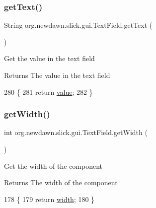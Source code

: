 \subsubsection{\texorpdfstring{get\+Text()}{getText()}}
{\footnotesize\ttfamily String org.\+newdawn.\+slick.\+gui.\+Text\+Field.\+get\+Text (\begin{DoxyParamCaption}{ }\end{DoxyParamCaption})\hspace{0.3cm}{\ttfamily [inline]}}

Get the value in the text field

\begin{DoxyReturn}{Returns}
The value in the text field 
\end{DoxyReturn}

\begin{DoxyCode}
280                             \{
281         \textcolor{keywordflow}{return} \mbox{\hyperlink{classorg_1_1newdawn_1_1slick_1_1gui_1_1_text_field_a23c571aa0aa30ccbc28a090a06a444b7}{value}};
282     \}
\end{DoxyCode}
\mbox{\label{classorg_1_1newdawn_1_1slick_1_1gui_1_1_text_field_a2080debdd772603b3165cda49864255d}} 
\subsubsection{\texorpdfstring{get\+Width()}{getWidth()}}
{\footnotesize\ttfamily int org.\+newdawn.\+slick.\+gui.\+Text\+Field.\+get\+Width (\begin{DoxyParamCaption}{ }\end{DoxyParamCaption})\hspace{0.3cm}{\ttfamily [inline]}}

Get the width of the component

\begin{DoxyReturn}{Returns}
The width of the component 
\end{DoxyReturn}

\begin{DoxyCode}
178                           \{
179         \textcolor{keywordflow}{return} \mbox{\hyperlink{classorg_1_1newdawn_1_1slick_1_1gui_1_1_text_field_aa0b76a23e9820ca0c01294f8de515b8e}{width}};
180     \}
\end{DoxyCode}
\mbox{\label{classorg_1_1newdawn_1_1slick_1_1gui_1_1_text_field_a42552f68cb0c015f2d127fd190a0afce}} 
